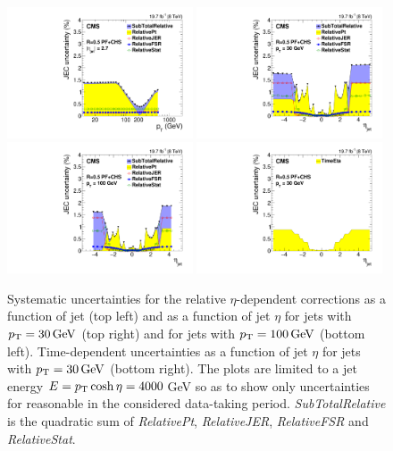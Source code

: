 \documentclass[11pt,twoside,a4paper,cmspaper,final,collab]{cms-tdr}
\begin{document}
\begin{figure}[htbp!]
\centering
\includegraphics[width=0.49\textwidth]{Figure_018-a.pdf}
\includegraphics[width=0.49\textwidth]{Figure_018-b.pdf}
\includegraphics[width=0.49\textwidth]{Figure_018-c.pdf}
\includegraphics[width=0.49\textwidth]{Figure_018-d.pdf}
\caption{\label{fig:etasys}
Systematic uncertainties for the relative $\eta$-dependent corrections as a function of jet \pt (top left) and as a function of jet
$\eta$ for jets with $p_{\mathrm{T}}=30\,\text{Ge\hspace{-.08em}V}$
(top right) and for jets with $p_{\mathrm{T}}=100\,\text{Ge\hspace{-.08em}V}$ (bottom left). Time-dependent uncertainties
as a function of jet $\eta$ for jets with $p_{\mathrm{T}}=30\,\text{Ge\hspace{-.08em}V}$ (bottom right). The plots are limited to a jet energy $E=p_{\mathrm{T}}\cosh\eta=4000$\,GeV so as to show only uncertainties for reasonable \pt in the considered data-taking period.
\textit{SubTotalRelative} is the quadratic sum of \textit{RelativePt}, \textit{RelativeJER}, \textit{RelativeFSR} and \textit{RelativeStat}.
}
\end{figure}
\end{document}
